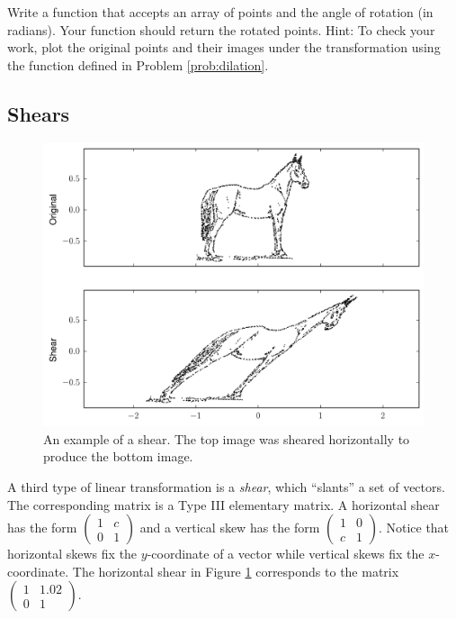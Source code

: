 \begin{problem}
 Write a function that accepts an array of points and the angle of rotation (in radians). 
 Your function should return the rotated points. 
 Hint: To check your work, plot the original points and their images under the transformation using the function  defined in Problem \ref{prob:dilation}.
\end{problem}

\subsection*{Shears}

\begin{figure}
\includegraphics[width=\textwidth]{shear.pdf}
\caption{An example of a shear.
The top image was sheared horizontally to produce the bottom image.}
\label{fig:shear}
\end{figure}

A third type of linear transformation is a \emph{shear}, which ``slants'' a set of vectors. 
The corresponding matrix is a Type III elementary matrix. 
A horizontal shear has the form $\begin{pmatrix}
1 & c \\
0 & 1
\end{pmatrix}$ and a vertical skew has the form $
 \begin{pmatrix}
1 & 0 \\
c & 1
\end{pmatrix}
$. 
Notice that horizontal skews fix the $y$-coordinate of a vector while vertical skews fix the $x$-coordinate. 
The horizontal shear in Figure \ref{fig:shear} corresponds to the matrix $\begin{pmatrix}
1 & 1.02 \\
0 & 1
\end{pmatrix}
$.



